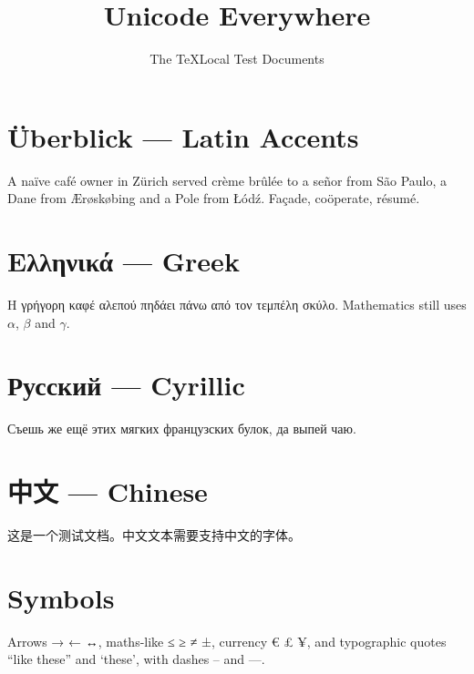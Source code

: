 \documentclass[11pt]{article}
\title{Unicode Everywhere}
\author{The TeXLocal Test Documents}
\begin{document}
\maketitle

\section{Überblick — Latin Accents}
A naïve café owner in Zürich served crème brûlée to a señor from São Paulo,
a Dane from Ærøskøbing and a Pole from Łódź. Façade, coöperate, résumé.

\section{Ελληνικά — Greek}
Η γρήγορη καφέ αλεπού πηδάει πάνω από τον τεμπέλη σκύλο. Mathematics still
uses $\alpha$, $\beta$ and $\gamma$.

\section{Русский — Cyrillic}
Съешь же ещё этих мягких французских булок, да выпей чаю.

\section{\texorpdfstring{{\cjkfont 中文}}{中文} — Chinese}
{\cjkfont 这是一个测试文档。中文文本需要支持中文的字体。}

\section{Symbols}
Arrows → ← ↔, maths-like ≤ ≥ ≠ ±, currency € £ ¥, and typographic
quotes “like these” and ‘these’, with dashes – and —.


\end{document}
